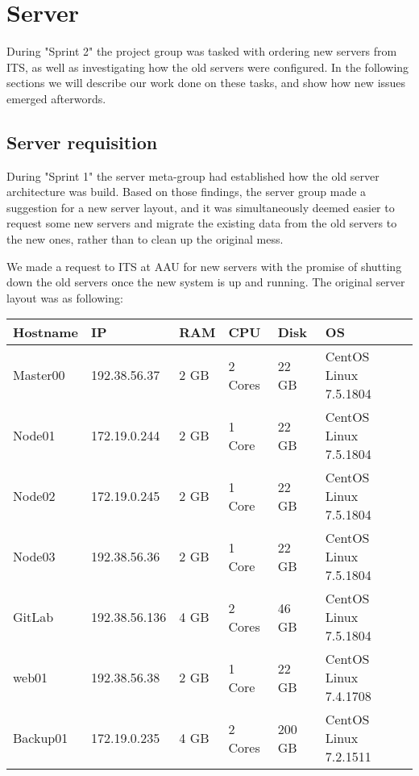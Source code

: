 \section{Server}\label{SEC:S2ServerWork}
During "Sprint 2" the project group was tasked with ordering new servers from ITS, as well as investigating how the old servers were configured. 
In the following sections we will describe our work done on these tasks, and show how new issues emerged afterwords. 

\subsection{Server requisition}
During "Sprint 1" the server meta-group had established how the old server architecture was build. 
Based on those findings, the server group made a suggestion for a new server layout, and it was simultaneously deemed easier to request some new servers and migrate the existing data from the old servers to the new ones, rather than to clean up the original mess. 

We made a request to ITS at AAU for new servers with the promise of shutting down the old servers once the new system is up and running. The original server layout was as following:

\begin{table}[H]

\begin{tabular}{|l|l|l|l|l|l|}
\hline
Hostname & IP 			& RAM 	& CPU 		& Disk 	& OS 					\\ \hline
Master00 & 192.38.56.37 	& 2 GB 	& 2 Cores 	& 22 GB 	& CentOS Linux 7.5.1804 	\\ \hline
Node01 	& 172.19.0.244 	& 2 GB 	& 1 Core 	& 22 GB 	& CentOS Linux 7.5.1804 	\\ \hline
Node02	& 172.19.0.245	& 2 GB	& 1 Core		& 22 GB	& CentOS Linux 7.5.1804	\\ \hline
Node03	& 192.38.56.36	& 2 GB	& 1 Core 	& 22 GB	& CentOS Linux 7.5.1804 	\\ \hline
GitLab 	& 192.38.56.136	& 4 GB	& 2 Cores 	& 46 GB 	& CentOS Linux 7.5.1804 	\\ \hline
web01	& 192.38.56.38	& 2 GB	& 1 Core		& 22 GB 	& CentOS Linux 7.4.1708 	\\ \hline
Backup01	& 172.19.0.235	& 4 GB	& 2 Cores	& 200 GB & CentOS Linux 7.2.1511 	\\ \hline
\end{tabular}
\end{table}

